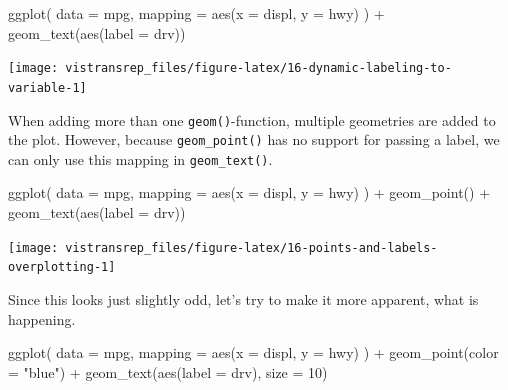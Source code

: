 \documentclass[]{book}
\newenvironment{Shaded}{}{}
\newcommand{\DataTypeTok}[1]{#1}
\newcommand{\DecValTok}[1]{#1}
\newcommand{\KeywordTok}[1]{\textcolor[rgb]{0.00,0.00,1.00}{#1}}
\newcommand{\NormalTok}[1]{#1}
\newcommand{\OperatorTok}[1]{#1}
\newcommand{\StringTok}[1]{\textcolor[rgb]{0.00,0.50,0.50}{#1}}
\begin{document}
\begin{Shaded}
\begin{Highlighting}[]
\KeywordTok{ggplot}\NormalTok{(}
  \DataTypeTok{data =}\NormalTok{ mpg,}
  \DataTypeTok{mapping =} \KeywordTok{aes}\NormalTok{(}\DataTypeTok{x =}\NormalTok{ displ, }\DataTypeTok{y =}\NormalTok{ hwy)}
\NormalTok{) }\OperatorTok{+}
\StringTok{  }\KeywordTok{geom_text}\NormalTok{(}\KeywordTok{aes}\NormalTok{(}\DataTypeTok{label =}\NormalTok{ drv))}
\end{Highlighting}
\end{Shaded}

\begin{flushright}\texttt{[image: vistransrep\_files/figure-latex/16-dynamic-labeling-to-variable-1]} \end{flushright}

When adding more than one \texttt{geom()}-function, multiple geometries are added to the plot.
However, because \texttt{geom\_point()} has no support for passing a label, we can only use this mapping in \texttt{geom\_text()}.

\begin{Shaded}
\begin{Highlighting}[]
\KeywordTok{ggplot}\NormalTok{(}
  \DataTypeTok{data =}\NormalTok{ mpg,}
  \DataTypeTok{mapping =} \KeywordTok{aes}\NormalTok{(}\DataTypeTok{x =}\NormalTok{ displ, }\DataTypeTok{y =}\NormalTok{ hwy)}
\NormalTok{) }\OperatorTok{+}
\StringTok{  }\KeywordTok{geom_point}\NormalTok{() }\OperatorTok{+}
\StringTok{  }\KeywordTok{geom_text}\NormalTok{(}\KeywordTok{aes}\NormalTok{(}\DataTypeTok{label =}\NormalTok{ drv))}
\end{Highlighting}
\end{Shaded}

\begin{flushright}\texttt{[image: vistransrep\_files/figure-latex/16-points-and-labels-overplotting-1]} \end{flushright}

Since this looks just slightly odd, let's try to make it more apparent, what is happening.

\begin{Shaded}
\begin{Highlighting}[]
\KeywordTok{ggplot}\NormalTok{(}
  \DataTypeTok{data =}\NormalTok{ mpg,}
  \DataTypeTok{mapping =} \KeywordTok{aes}\NormalTok{(}\DataTypeTok{x =}\NormalTok{ displ, }\DataTypeTok{y =}\NormalTok{ hwy)}
\NormalTok{) }\OperatorTok{+}
\StringTok{  }\KeywordTok{geom_point}\NormalTok{(}\DataTypeTok{color =} \StringTok{"blue"}\NormalTok{) }\OperatorTok{+}
\StringTok{  }\KeywordTok{geom_text}\NormalTok{(}\KeywordTok{aes}\NormalTok{(}\DataTypeTok{label =}\NormalTok{ drv), }\DataTypeTok{size =} \DecValTok{10}\NormalTok{)}
\end{Highlighting}
\end{Shaded}
\end{document}
